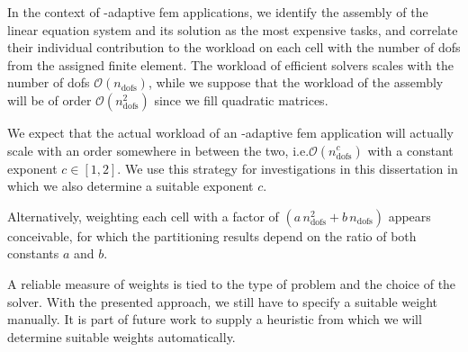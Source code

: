 


In the context of \hp-adaptive \gls{fem} applications, we identify the assembly of the linear equation system and its solution as the most expensive tasks, and correlate their individual contribution to the workload on each cell with the number of \glspl{dof} from the assigned finite element.
The workload of efficient solvers scales with the number of \glspl{dof} $\mathcal{O}\left(n_\text{dofs}\right)$, while we suppose that the workload of the assembly will be of order $\mathcal{O}\left(n_\text{dofs}^2\right)$ since we fill quadratic matrices.

We expect that the actual workload of an \hp-adaptive \gls{fem} application will actually scale with an order somewhere in between the two, i.e.\@ $\mathcal{O}\left(n_\text{dofs}^c\right)$ with a constant exponent $c \in [1,2]$. We use this strategy for investigations in this dissertation in which we also determine a suitable exponent $c$.

Alternatively, weighting each cell with a factor of $(a \, n_\text{dofs}^2 + b \, n_\text{dofs})$ appears conceivable, for which the partitioning results depend on the ratio of both constants $a$ and $b$.


A reliable measure of weights is tied to the type of problem and the choice of the solver. With the presented approach, we still have to specify a suitable weight manually. It is part of future work to supply a heuristic from which we will determine suitable weights automatically. %